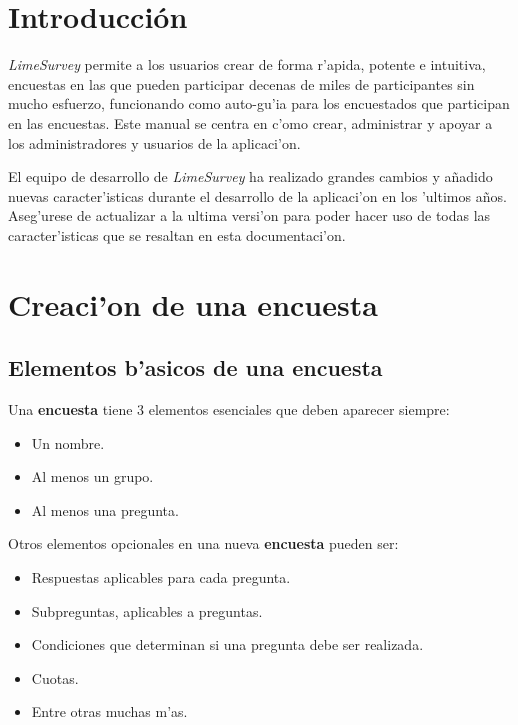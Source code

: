 \documentclass[12pt,spanish]{report}
\begin{document}
\doublespacing
{}
\tableofcontents
\newpage


\chapter{Introducci\'on}
\newpage

\emph{LimeSurvey} permite a los usuarios crear de forma r'apida, potente e intuitiva, encuestas en las que pueden participar decenas de miles de participantes sin mucho esfuerzo, funcionando como auto-gu'ia para los encuestados que participan en las encuestas. Este manual se centra en c'omo crear, administrar y apoyar a los administradores y usuarios de la aplicaci'on.

El equipo de desarrollo de \emph{LimeSurvey} ha realizado grandes cambios y añadido nuevas caracter'isticas durante el desarrollo de la aplicaci'on en los 'ultimos años. Aseg'urese de actualizar a la ultima versi'on para poder hacer uso de todas las caracter'isticas que se resaltan en esta documentaci'on.
\newpage

\chapter{Creaci'on de una encuesta}
\newpage

\section{Elementos b'asicos de una encuesta}

Una {\bf encuesta} tiene 3 elementos esenciales que deben aparecer siempre:

\begin{itemize}
\item Un nombre.
\item Al menos un grupo.
\item Al menos una pregunta.
\end{itemize}

Otros elementos opcionales en una nueva {\bf encuesta}  pueden ser:
\begin{itemize}
\item Respuestas aplicables para cada pregunta.
\item Subpreguntas, aplicables a preguntas.
\item Condiciones que determinan si una pregunta debe ser realizada.
\item Cuotas.
\item Entre otras muchas m'as.
\end{itemize}
\end{document}
